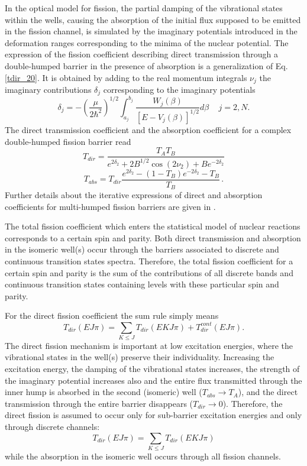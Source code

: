 In the optical model for fission, the partial damping of the vibrational
states within the wells, causing the absorption of the initial flux supposed
to be emitted in the fission channel, is simulated by the imaginary
potentials introduced in the deformation ranges corresponding to the minima
of the nuclear potential. The expression of the fission coefficient
describing direct transmission through a double-humped barrier in the
presence of absorption is a generalization of Eq.\ref{tdir_20}. It is
obtained by adding to the real momentum integrals $\nu_j$ the imaginary
contributions $\delta_j$ corresponding to the imaginary potentials \cite%
{Bhandari:79}
\begin{equation}
\delta_j=-\left( \frac{\mu}{2\hbar^{2}}\right) ^{1/2}\int_{a_{j}}^{b_{j}}%
\frac{W_j(\beta)}{[E-V_{j}(\beta)]^{1/2}}d\beta\,\quad j=2,N.
\end{equation}
The direct transmission coefficient and the absorption coefficient for a
complex double-humped fission barrier read
\begin{equation}
T_{dir}=\frac{T_{A}T_{B}}{e^{2\delta_2}+2B^{1/2}\cos
(2\nu_{2})+Be^{-2\delta_2}}  \label{tdir_2}
\end{equation}
\begin{equation}
T_{abs}=T_{dir}\frac{e^{2\delta_2}-(1-T_{B})e^{-2\delta_2}-T_{B}}{T_{B}}\,.
\label{tabs_2}
\end{equation}
Further details about the iterative expressions of direct and absorption
coefficients for multi-humped fission barriers are given in \cite{Sin:07}%
.

The total fission coefficient which enters the statistical model of nuclear
reactions corresponds to a certain spin and parity. Both direct transmission
and absorption in the isomeric well(s) occur through the barriers associated
to discrete and continuous transition states spectra. Therefore, the total
fission coefficient for a certain spin and parity is the sum of the
contributions of all discrete bands and continuous transition states
containing levels with these particular spin and parity.

For the direct fission coefficient the sum rule simply means
\begin{equation}
T_{dir}(EJ\pi)= \sum_{K\le J}T_{dir}(EKJ\pi)+ T_{dir}^{cont}(EJ\pi).
\end{equation}
The direct fission mechanism is important at low excitation energies, where
the vibrational states in the well(s) preserve their individuality.
Increasing the excitation energy, the damping of the vibrational states
increases, the strength of the imaginary potential increases also and the
entire flux transmitted through the inner hump is absorbed in the second
(isomeric) well ($T_{abs}\rightarrow T_{A}$), and the direct transmission
through the entire barrier disappears ($T_{dir}\rightarrow0$). Therefore,
the direct fission is assumed to occur only for sub-barrier excitation
energies and only through discrete channels:
\begin{equation}
T_{dir}(EJ\pi)=\sum_{K\le J}T_{dir}(EKJ\pi)  \label{tdirt}
\end{equation}
while the absorption in the isomeric well occurs through all fission
channels.

